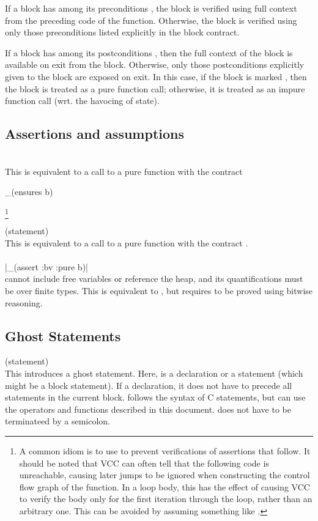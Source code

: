 \documentclass[preprint,nocopyrightspace]{sigplanconf}
\begin{document}
{{{If a block has among its
preconditions , the block is verified
using full context from the preceding code of the function. Otherwise,
the block is verified using only those preconditions listed explicitly
in the block contract.

If a block has among its
postconditions , then the full context
of the block is available on exit from the block. Otherwise, only
those postconditions explicitly given to the block are exposed on
exit. In this case, if the block is marked , then the
block is treated as a pure function call; otherwise, it is treated as
an impure function call (wrt. the havocing of state). 

\subsection{Assertions and assumptions}
\\
This is equivalent to a call to a pure function with the contract
\begin{VCC}
_(ensures b)
\end{VCC}
\footnote{
A common idiom is to use  to prevent
verifications of assertions that follow. It should be noted that VCC
can often tell that the following code is unreachable, causing later
jumps to be ignored when constructing the control flow graph of the
function. In a loop body, this has the effect of causing VCC to verify
the body only for the first iteration through the loop, rather than an
arbitrary one. This can be avoided by assuming something like 
.}

\noindent{} (statement)\\
This is equivalent to a call to a pure function with the contract
. 
\\\\
\vcc|_(assert {:bv} :pure b)|\\
 cannot include free variables or reference the heap, and its
quantifications must be over finite types.
This is equivalent to , but
requires  to be proved using bitwise reasoning. 

\subsection{Ghost Statements}
 (statement)\\
This introduces a ghost statement.
Here,  is a declaration or a statement (which might be a
block statement). If a declaration,
it does not have to precede all statements in the current block.
 follows the syntax of C statements, but can use the
operators and functions described in this document.  does
not have to be terminateed by a semicolon.

}}}
\end{document}
